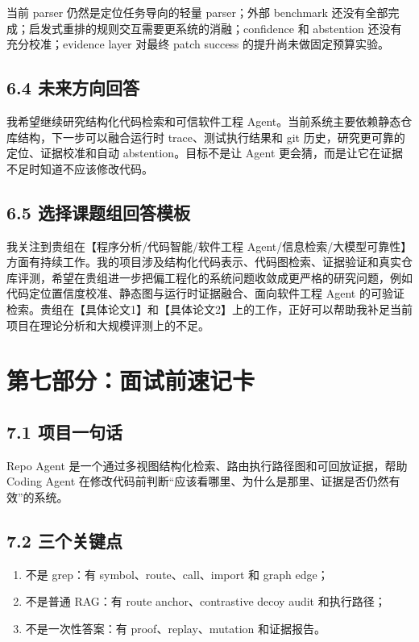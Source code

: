 \documentclass[UTF8,12pt,openany]{ctexbook}
\begin{document}
当前 parser 仍然是定位任务导向的轻量 parser；外部 benchmark 还没有全部完成；启发式重排的规则交互需要更系统的消融；confidence 和 abstention 还没有充分校准；evidence layer 对最终 patch success 的提升尚未做固定预算实验。\par

\section{6.4 未来方向回答}

我希望继续研究结构化代码检索和可信软件工程 Agent。当前系统主要依赖静态仓库结构，下一步可以融合运行时 trace、测试执行结果和 git 历史，研究更可靠的定位、证据校准和自动 abstention。目标不是让 Agent 更会猜，而是让它在证据不足时知道不应该修改代码。\par

\section{6.5 选择课题组回答模板}

我关注到贵组在【程序分析/代码智能/软件工程 Agent/信息检索/大模型可靠性】方面有持续工作。我的项目涉及结构化代码表示、代码图检索、证据验证和真实仓库评测，希望在贵组进一步把偏工程化的系统问题收敛成更严格的研究问题，例如代码定位置信度校准、静态图与运行时证据融合、面向软件工程 Agent 的可验证检索。贵组在【具体论文1】和【具体论文2】上的工作，正好可以帮助我补足当前项目在理论分析和大规模评测上的不足。\par

\clearpage
\chapter{第七部分：面试前速记卡}

\section{7.1 项目一句话}

Repo Agent 是一个通过多视图结构化检索、路由执行路径图和可回放证据，帮助 Coding Agent 在修改代码前判断“应该看哪里、为什么是那里、证据是否仍然有效”的系统。\par

\section{7.2 三个关键点}

\begin{enumerate}
\item 不是 grep：有 symbol、route、call、import 和 graph edge；
\item 不是普通 RAG：有 route anchor、contrastive decoy audit 和执行路径；
\item 不是一次性答案：有 proof、replay、mutation 和证据报告。
\end{enumerate}
\end{document}
